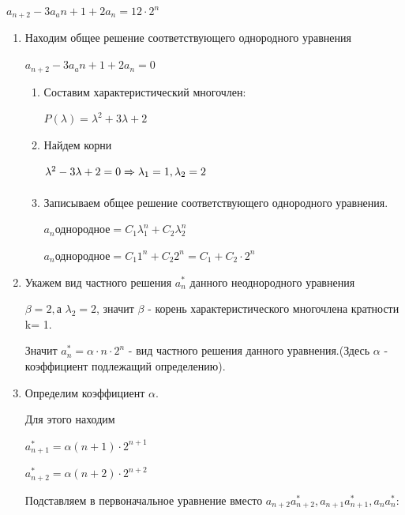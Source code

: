 \documentclass[12pt, a4paper, oneside]{article}
\theoremstyle{plain} %
\theoremstyle{definition}
\begin{document}
$a_{n+2} - 3 a_a{n+1} + 2 a_n = 12 \cdot 2^n$

\begin{enumerate}

    \item Находим общее решение соответствующего однородного уравнения
    
    $a_{n+2} - 3 a_a{n+1} + 2 a_n = 0 $
    
    \begin{enumerate}
        \item Составим характеристический многочлен:
        
        $P(\lambda) = \lambda ^2 + 3 \lambda + 2 $
        
        \item Найдем корни 
        
        $\lambda^2 - 3 \lambda + 2 = 0
        \xRightarrow[]{}
        \lambda_1 = 1, \lambda_2 = 2$
        
        
        
        \item Записываем общее решение  соответствующего однородного уравнения.
        
        $a_n \text{однородное} = C_1 \lambda_{1}^n + C_2 \lambda_{2}^n$
        
        $a_n \text{однородное} = C_1 {1}^n + C_2 {2}^n = C_1 + C_2 \cdot {2}^n $
    
    \end{enumerate}
    
    
    
    \item Укажем вид частного решения $a_n^*$ данного неоднородного уравнения 
    
    $\beta = 2,\text{а } \lambda_2 = 2 $, значит $\beta$ - корень характеристического многочлена кратности k= 1. 
    
    Значит $a_n^* = \alpha \cdot n \cdot 2^n $ - вид частного решения данного уравнения.(Здесь $\alpha$ - коэффициент подлежащий определению). 
    
    \item Определим коэффициент $\alpha$.
    
    Для этого находим
    
    $a_{n+1}^*= \alpha (n+1) \cdot 2^{n+1} $
    
    $a_{n+2}^*= \alpha (n+2) \cdot 2^{n+2}$
    
    Подставляем в первоначальное уравнение вместо  $a_{n+2} a_{n+2}^*, a_{n+1} a_{n+1}^*, a_{n} a_{n}^*$:
    

\end{enumerate}
\end{document}
